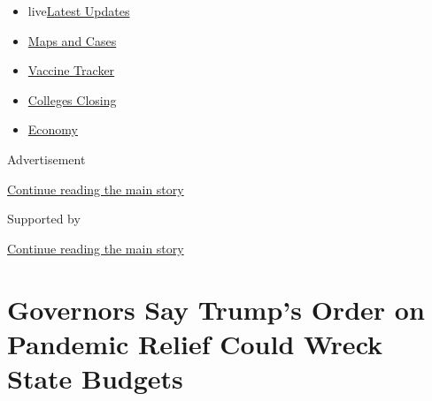 \begin{itemize}
\tightlist
\item
  live\href{https://www.nytimes3xbfgragh.onion/2020/08/20/world/coronavirus-covid.html?name=styln-coronavirus-national\&region=TOP_BANNER\&variant=undefined\&block=storyline_menu_recirc\&action=click\&pgtype=Article\&impression_id=df54e6e1-e37a-11ea-9d29-b1d4cf4b3021}{Latest
  Updates}
\item
  \href{https://www.nytimes3xbfgragh.onion/interactive/2020/us/coronavirus-us-cases.html?name=styln-coronavirus-national\&region=TOP_BANNER\&variant=undefined\&block=storyline_menu_recirc\&action=click\&pgtype=Article\&impression_id=df550df0-e37a-11ea-9d29-b1d4cf4b3021}{Maps
  and Cases}
\item
  \href{https://www.nytimes3xbfgragh.onion/interactive/2020/science/coronavirus-vaccine-tracker.html?name=styln-coronavirus-national\&region=TOP_BANNER\&variant=undefined\&block=storyline_menu_recirc\&action=click\&pgtype=Article\&impression_id=df550df1-e37a-11ea-9d29-b1d4cf4b3021}{Vaccine
  Tracker}
\item
  \href{https://www.nytimes3xbfgragh.onion/2020/08/19/us/colleges-closing-covid.html?name=styln-coronavirus-national\&region=TOP_BANNER\&variant=undefined\&block=storyline_menu_recirc\&action=click\&pgtype=Article\&impression_id=df550df2-e37a-11ea-9d29-b1d4cf4b3021}{Colleges
  Closing}
\item
  \href{https://www.nytimes3xbfgragh.onion/live/2020/08/20/business/stock-market-today-coronavirus?name=styln-coronavirus-national\&region=TOP_BANNER\&variant=undefined\&block=storyline_menu_recirc\&action=click\&pgtype=Article\&impression_id=df550df3-e37a-11ea-9d29-b1d4cf4b3021}{Economy}
\end{itemize}

Advertisement

\protect\hyperlink{after-top}{Continue reading the main story}

Supported by

\protect\hyperlink{after-sponsor}{Continue reading the main story}

\hypertarget{governors-say-trumps-order-on-pandemic-relief-could-wreck-state-budgets}{%
\section{Governors Say Trump's Order on Pandemic Relief Could Wreck
State
Budgets}\label{governors-say-trumps-order-on-pandemic-relief-could-wreck-state-budgets}}

